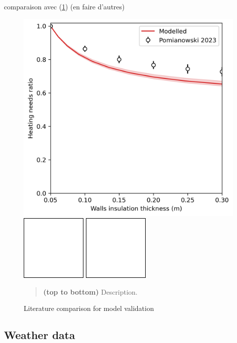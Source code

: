 \documentclass[11pt]{article}
\begin{document}
        comparaison avec \textcite{pomianowski_method_2023} (\ref{fig:model_validation}) (en faire d'autres)

        \begin{figure}[ht]
            \centering
            \includegraphics[width=0.32\columnwidth]{figures/effect_walls_insulation_heating_needs_litterature.png}
            \includegraphics[width=0.3\columnwidth]{figures/blank.png}
            \includegraphics[width=0.3\columnwidth]{figures/blank.png}
            \caption{\label{fig:model_validation} Literature comparison for model validation}
                \begin{quote}
                    \vspace{-2mm}
                    \small\noindent
                    \textbf{(top to bottom)} Description. 
                \end{quote}
        \end{figure}  
    


    \clearpage
    \subsection{Weather data} %
    \label{sub:weather_data}
\end{document}

